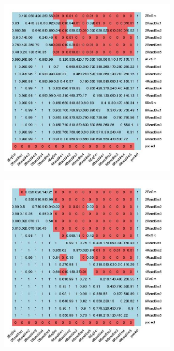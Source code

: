 \documentclass[main]{subfiles}
\begin{document}
\begin{figure}[h]
\centering
\begin{subfigure}{.5\textwidth}
  \centering
  \includegraphics[width=\linewidth]{images/heatmapSpam}
\end{subfigure}%
\begin{subfigure}{.5\textwidth}
  \centering
  \includegraphics[width=\linewidth]{images/heatmapSpam_eff}

\end{subfigure}
\end{figure}
\end{document}
